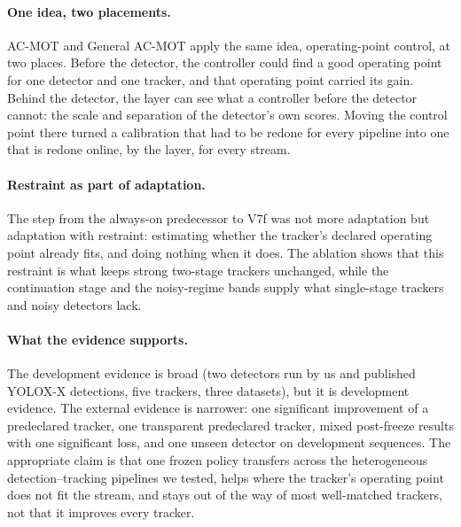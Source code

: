 \documentclass[pdflatex,sn-mathphys-num]{sn-jnl}
\begin{document}
\paragraph{One idea, two placements.} AC-MOT and General AC-MOT apply the same idea, operating-point control, at two places. Before the detector, the controller could find a good operating point for one detector and one tracker, and that operating point carried its gain. Behind the detector, the layer can see what a controller before the detector cannot: the scale and separation of the detector's own scores. Moving the control point there turned a calibration that had to be redone for every pipeline into one that is redone online, by the layer, for every stream.

\paragraph{Restraint as part of adaptation.} The step from the always-on predecessor to V7f was not more adaptation but adaptation with restraint: estimating whether the tracker's declared operating point already fits, and doing nothing when it does. The ablation shows that this restraint is what keeps strong two-stage trackers unchanged, while the continuation stage and the noisy-regime bands supply what single-stage trackers and noisy detectors lack.

\paragraph{What the evidence supports.} The development evidence is broad (two detectors run by us and published YOLOX-X detections, five trackers, three datasets), but it is development evidence. The external evidence is narrower: one significant improvement of a predeclared tracker, one transparent predeclared tracker, mixed post-freeze results with one significant loss, and one unseen detector on development sequences. The appropriate claim is that one frozen policy transfers across the heterogeneous detection--tracking pipelines we tested, helps where the tracker's operating point does not fit the stream, and stays out of the way of most well-matched trackers, not that it improves every tracker.

\end{document}
